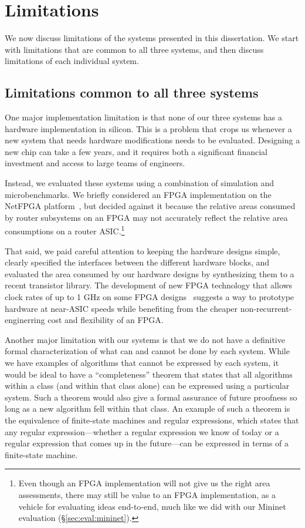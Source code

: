 \chapter{Limitations}
\label{chap:limitations}

We now discuss limitations of the systems presented in this dissertation. We
start with limitations that are common to all three systems, and then discuss
limitations of each individual system.

\section{Limitations common to all three systems}

 One major implementation limitation is
that none of our three systems has a hardware implementation in silicon. This
is a problem that crops us whenever a new system that needs hardware
modifications needs to be evaluated. Designing a new chip can take a few years,
and it requires both a significant financial investment and access to large
teams of engineers.

 Instead, we evaluated these systems using a combination of simulation and
microbenchmarks. We briefly considered an FPGA implementation on the NetFPGA
platform~\cite{netfpga}, but decided against it because the relative areas
consumed by router subsystems on an FPGA may not accurately reflect the relative
area consumptions on a router ASIC.\footnote{Even though an FPGA implementation
will not give us the right area assessments, there may still be value to an
FPGA implementation, as a vehicle for evaluating ideas end-to-end, much like we
did with our Mininet evaluation (\S\ref{sec:eval:mininet}).}

That said, we paid careful attention to keeping the hardware designs simple,
clearly specified the interfaces between the different hardware blocks, and
evaluated the area consumed by our hardware designs by synthesizing them to a
recent transistor library. The development of new FPGA technology that allows
clock rates of up to 1 GHz on some FPGA designs~\cite{hyperflex} suggests a way
to prototype hardware at near-ASIC speeds while benefiting from the cheaper
non-recurrent-enginerring cost and flexibility of an FPGA.

 Another major limitation with our systems
is that we do not have a definitive formal characterization of what can and
cannot be done by each system. While we have examples of algorithms that cannot
be expressed by each system, it would be ideal to have a ``completeness''
theorem that states that all algorithms within a class (and within that class
alone) can be expressed using a particular system. Such a theorem would also
give a formal assurance of future proofness so long as a new algorithm fell
within that class. An example of such a theorem is the equivalence of
finite-state machines and regular expressions, which states that any regular
expression---whether a regular expression we know of today or a regular
expression that comes up in the future---can be expressed in terms of a
finite-state machine.

